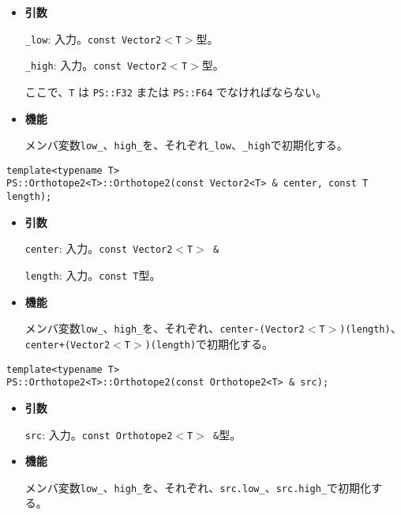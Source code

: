 \begin{itemize}

\item{{\bf 引数}}

\texttt{\_low}: 入力。\texttt{const Vector2$<$T$>$}型。

\texttt{\_high}: 入力。\texttt{const Vector2$<$T$>$}型。

ここで、\texttt{T} は \texttt{PS::F32} または \texttt{PS::F64} でなければならない。

\item{{\bf 機能}}

メンバ変数\texttt{low\_}、\texttt{high\_}を、それぞれ\texttt{\_low}、\texttt{\_high}で初期化する。

\end{itemize}
\begin{screen}
\begin{verbatim}
template<typename T>
PS::Orthotope2<T>::Orthotope2(const Vector2<T> & center, const T length);
\end{verbatim}
\end{screen}

\begin{itemize}

\item{{\bf 引数}}

\texttt{center}: 入力。\texttt{const Vector2$<$T$>$ \&}

\texttt{length}: 入力。\texttt{const T}型。

\item{{\bf 機能}}

メンバ変数\texttt{low\_}、\texttt{high\_}を、それぞれ、\texttt{center-(Vector2$<$T$>$)(length)}、\texttt{center+(Vector2$<$T$>$)(length)}で初期化する。

\end{itemize}


\begin{screen}
\begin{verbatim}
template<typename T>
PS::Orthotope2<T>::Orthotope2(const Orthotope2<T> & src);
\end{verbatim}
\end{screen}

\begin{itemize}

\item{{\bf 引数}}

\texttt{src}: 入力。\texttt{const Orthotope2$<$T$>$ \&}型。

\item{{\bf 機能}}

メンバ変数\texttt{low\_}、\texttt{high\_}を、それぞれ、\texttt{src.low\_}、\texttt{src.high\_}で初期化する。

\end{itemize}


